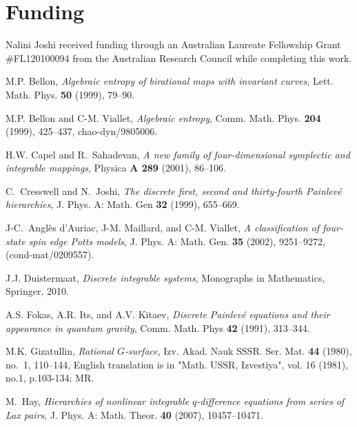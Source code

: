 \documentclass[reqno]{amsart}
\numberwithin{equation}{section}
\numberwithin{figure}{section}
\begin{document}
\section*{Funding}
Nalini Joshi received funding through an Australian Laureate
Fellowship Grant \#FL120100094 from the Australian Research Council
while completing this work.

%
\providecommand{\bysame}{\leavevmode\hbox to3em{\hrulefill}\thinspace}
\providecommand{\MR}{\relax\ifhmode\unskip\space\fi MR }
\providecommand{\MRhref}[2]{%
  \href{http://www.ams.org/mathscinet-getitem?mr=#1}{#2}
}
\providecommand{\href}[2]{#2}
\begin{thebibliography}{10}

M.P. Bellon, \emph{Algebraic entropy of birational maps with invariant curves},
  Lett. Math. Phys. \textbf{50} (1999), 79--90.

M.P. Bellon and C-M. Viallet, \emph{Algebraic entropy}, Comm. Math. Phys.
  \textbf{204} (1999), 425--437, chao-dyn/9805006.

H.W. Capel and R.~Sahadevan, \emph{A new family of four-dimensional symplectic
  and integrable mappings}, Physica \textbf{A 289} (2001), 86--106.

C.~Cresswell and N.~Joshi, \emph{The discrete first, second and thirty-fourth
  {P}ainlev\'e hierarchies}, J. Phys. A: Math. Gen \textbf{32} (1999),
  655--669.

J-C.~Angl\`es d'Auriac, J-M. Maillard, and C-M. Viallet, \emph{A classification
  of four-state spin edge {P}otts models}, J. Phys. A: Math. Gen. \textbf{35}
  (2002), 9251--9272, (cond-mat/0209557).

J.J. Duistermaat, \emph{Discrete integrable systems}, Monographs in
  Mathematics, Springer, 2010.

A.S. Fokas, A.R. Its, and A.V. Kitaev, \emph{Discrete {P}ainlev\'e equations
  and their appearance in quantum gravity}, Comm. Math. Phys \textbf{42}
  (1991), 313--344.

M.K. Gizatullin, \emph{Rational ${G}$-surface}, Izv. Akad. Nauk SSSR. Ser. Mat.
  \textbf{44} (1980), no.~1, 110--144, English translation is in "Math. USSR,
  Izvestiya", vol. 16 (1981), no.1, p.103-134: MR.

M.~Hay, \emph{Hierarchies of nonlinear integrable $q$-difference equations from
  series of {L}ax pairs}, J. Phys. A: Math. Theor. \textbf{40} (2007),
  10457--10471.


\end{thebibliography}
\end{document}
